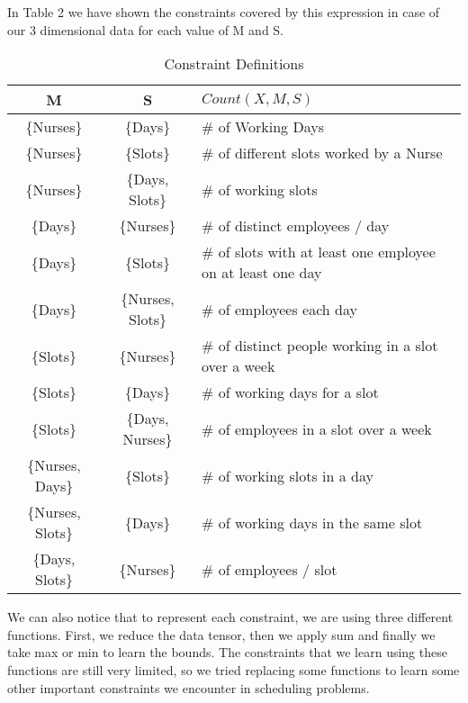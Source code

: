 \documentclass{article}
\begin{document}
In Table 2 we have shown the constraints covered by this expression in case of our 3 dimensional data for each value of M and S.

\begin{table}[H]
\begin{center}
\caption{Constraint Definitions}
\label{my-label}
\begin{tabular}{|c|c| m{3cm} |}
\hline
M                 & S                 & $Count(X,M,S)$                                               \\ \hline
\{Nurses\}        & \{Days\}          & \# of Working Days                                         \\ \hline
\{Nurses\}        & \{Slots\}         & \# of different slots worked by a Nurse                    \\ \hline
\{Nurses\}        & \{Days, Slots\}   & \# of working slots                                        \\ \hline
\{Days\}          & \{Nurses\}        & \# of distinct employees / day                                      \\ \hline
\{Days\}          & \{Slots\}         & \# of slots with at least one employee on at least one day \\ \hline
\{Days\}          & \{Nurses, Slots\} & \# of employees each day                     \\ \hline
\{Slots\}         & \{Nurses\}        & \# of distinct people working in a slot over a week        \\ \hline
\{Slots\}         & \{Days\}          & \# of working days for a slot                              \\ \hline
\{Slots\}         & \{Days, Nurses\}  & \# of employees in a slot over a week               \\ \hline
\{Nurses, Days\}  & \{Slots\}         & \# of working slots in a day                                  \\ \hline
\{Nurses, Slots\} & \{Days\}          & \# of working days in the same slot                                  \\ \hline
\{Days, Slots\}   & \{Nurses\}        & \# of employees / slot                                     \\ \hline
\end{tabular}
\end{center}
\end{table}

We can also notice that to represent each constraint, we are using three different functions. First, we reduce the data tensor, then we apply sum and finally we take max or min to learn the bounds. The constraints that we learn using these functions are still very limited, so we tried replacing some functions to learn some other important constraints we encounter in scheduling problems. 
\end{document}
